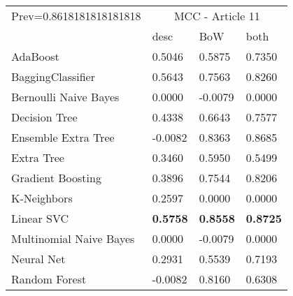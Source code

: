 \begin{tabular}{|l|l|l|l| }
\hline
Prev=0.8618181818181818 &  \multicolumn{3}{c|}{MCC - Article 11} \\
\cline{2-4} & desc & BoW & both \\ \hline
AdaBoost                & 0.5046 & 0.5875 & 0.7350\\
BaggingClassifier       & 0.5643 & 0.7563 & 0.8260\\
Bernoulli Naive Bayes   & 0.0000 & -0.0079 & 0.0000\\
Decision Tree           & 0.4338 & 0.6643 & 0.7577\\
Ensemble Extra Tree     & -0.0082 & 0.8363 & 0.8685\\
Extra Tree              & 0.3460 & 0.5950 & 0.5499\\
Gradient Boosting       & 0.3896 & 0.7544 & 0.8206\\
K-Neighbors             & 0.2597 & 0.0000 & 0.0000\\
Linear SVC              & {\bf 0.5758} & {\bf 0.8558} & {\bf 0.8725}\\
Multinomial Naive Bayes & 0.0000 & -0.0079 & 0.0000\\
Neural Net              & 0.2931 & 0.5539 & 0.7193\\
Random Forest           & -0.0082 & 0.8160 & 0.6308\\
\hline
\end{tabular}